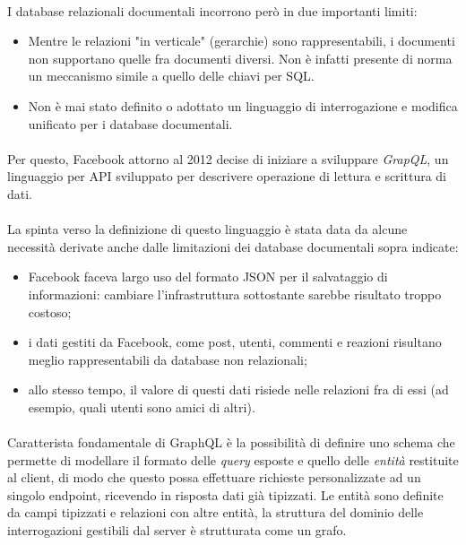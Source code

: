 \documentclass[a4paper, 12pt]{report}
\begin{document}
    \paragraph*{}
      I database relazionali documentali incorrono però in due importanti limiti:
      \begin{itemize}
        \item Mentre le relazioni "in verticale" (gerarchie) sono rappresentabili, i documenti non supportano quelle fra documenti diversi. Non è infatti presente di norma un meccanismo simile a quello delle chiavi per SQL.
        \item Non è mai stato definito o adottato un linguaggio di interrogazione e modifica unificato per i database documentali.
      \end{itemize}
    \paragraph*{}
      Per questo, Facebook attorno al 2012 decise di iniziare a sviluppare \emph{GrapQL}, un linguaggio per API sviluppato per descrivere operazione di lettura e scrittura di dati.
    \paragraph*{}
      La spinta verso la definizione di questo linguaggio è stata data da alcune necessità derivate anche dalle limitazioni dei database documentali sopra indicate:
      \begin{itemize}
        \item Facebook faceva largo uso del formato JSON per il salvataggio di informazioni: cambiare l'infrastruttura sottostante sarebbe risultato troppo costoso;
        \item i dati gestiti da Facebook, come post, utenti, commenti e reazioni risultano meglio rappresentabili da database non relazionali;
        \item allo stesso tempo, il valore di questi dati risiede nelle relazioni fra di essi (ad esempio, quali utenti sono amici di altri).
      \end{itemize}
    \paragraph*{}
      Caratterista fondamentale di GraphQL è la possibilità di definire uno schema che permette di modellare il formato delle \emph{query} esposte e quello delle \emph{entità} restituite al client, di modo che questo possa effettuare richieste personalizzate ad un singolo endpoint, ricevendo in risposta dati già tipizzati.
      Le entità sono definite da campi tipizzati e relazioni con altre entità, la struttura del dominio delle interrogazioni gestibili dal server è strutturata come un grafo.
\end{document}
